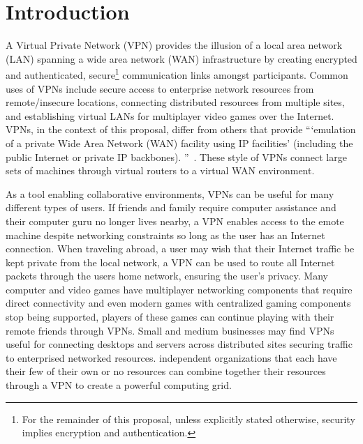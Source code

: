 \chapter{Introduction}
\label{introduction}
A Virtual Private Network (VPN) provides the illusion of a local area network
(LAN) spanning a wide area network (WAN) infrastructure by creating encrypted
and authenticated, secure\footnote{For the remainder of this proposal, unless
explicitly stated otherwise, security implies encryption and authentication.}
communication links amongst participants.  Common uses of VPNs include secure
access to enterprise network resources from remote/insecure locations,
connecting distributed resources from multiple sites, and establishing virtual
LANs for multiplayer video games over the Internet.  VPNs, in the context of
this proposal, differ from others that provide ```emulation of a private Wide
Area Network (WAN) facility using IP facilities' (including the public Internet
or private IP backbones).  ''~\cite{ip_vpns}.  These style of VPNs connect large
sets of machines through virtual routers to a virtual WAN environment.

As a tool enabling collaborative environments, VPNs can be useful for many
different types of users.  If friends and family require computer assistance
and their computer guru no longer lives nearby, a VPN enables access to the
emote machine despite networking constraints so long as the user has an
Internet connection.  When traveling abroad, a user may wish that their
Internet traffic be kept private from the local network, a VPN can be
used to route all Internet packets through the users home network, ensuring
the user's privacy.  Many computer and video games have multiplayer networking
components that require direct connectivity and even modern games with
centralized gaming components stop being supported, players of these games
can continue playing with their remote friends through VPNs.  Small and medium
businesses may find VPNs useful for connecting desktops and servers across
distributed sites securing traffic to enterprised networked resources.
independent organizations that each have their few of their own or no resources
can combine together their resources through a VPN to create a powerful
computing grid.

